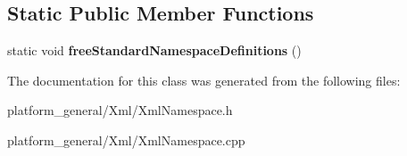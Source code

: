 \subsection*{\-Static \-Public \-Member \-Functions}
\begin{DoxyCompactItemize}
\item 
\hypertarget{classgeneral__server_1_1XmlHasNamespaceDefinitions_ae2823002b30452d408e31040e5644366}{static void {\bfseries free\-Standard\-Namespace\-Definitions} ()}\label{classgeneral__server_1_1XmlHasNamespaceDefinitions_ae2823002b30452d408e31040e5644366}

\end{DoxyCompactItemize}


\-The documentation for this class was generated from the following files\-:\begin{DoxyCompactItemize}
\item 
platform\-\_\-general/\-Xml/\-Xml\-Namespace.\-h\item 
platform\-\_\-general/\-Xml/\-Xml\-Namespace.\-cpp\end{DoxyCompactItemize}
